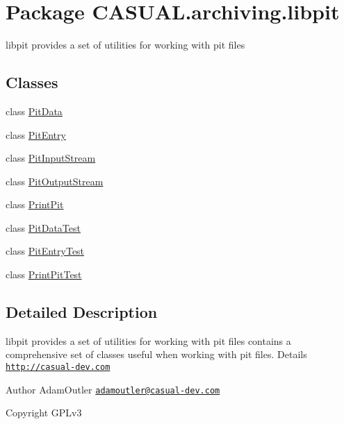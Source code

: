 \hypertarget{namespace_c_a_s_u_a_l_1_1archiving_1_1libpit}{\section{Package C\-A\-S\-U\-A\-L.\-archiving.\-libpit}
\label{namespace_c_a_s_u_a_l_1_1archiving_1_1libpit}
}


libpit provides a set of utilities for working with pit files  


\subsection*{Classes}
\begin{DoxyCompactItemize}
\item 
class \hyperlink{class_c_a_s_u_a_l_1_1archiving_1_1libpit_1_1_pit_data}{Pit\-Data}
\item 
class \hyperlink{class_c_a_s_u_a_l_1_1archiving_1_1libpit_1_1_pit_entry}{Pit\-Entry}
\item 
class \hyperlink{class_c_a_s_u_a_l_1_1archiving_1_1libpit_1_1_pit_input_stream}{Pit\-Input\-Stream}
\item 
class \hyperlink{class_c_a_s_u_a_l_1_1archiving_1_1libpit_1_1_pit_output_stream}{Pit\-Output\-Stream}
\item 
class \hyperlink{class_c_a_s_u_a_l_1_1archiving_1_1libpit_1_1_print_pit}{Print\-Pit}
\item 
class \hyperlink{class_c_a_s_u_a_l_1_1archiving_1_1libpit_1_1_pit_data_test}{Pit\-Data\-Test}
\item 
class \hyperlink{class_c_a_s_u_a_l_1_1archiving_1_1libpit_1_1_pit_entry_test}{Pit\-Entry\-Test}
\item 
class \hyperlink{class_c_a_s_u_a_l_1_1archiving_1_1libpit_1_1_print_pit_test}{Print\-Pit\-Test}
\end{DoxyCompactItemize}


\subsection{Detailed Description}
libpit provides a set of utilities for working with pit files contains a comprehensive set of classes useful when working with pit files. Details \href{http://casual-dev.com}{\tt http\-://casual-\/dev.\-com} \begin{DoxyAuthor}{Author}
Adam\-Outler \href{mailto:adamoutler@casual-dev.com}{\tt adamoutler@casual-\/dev.\-com} 
\end{DoxyAuthor}
\begin{DoxyCopyright}{Copyright}
G\-P\-Lv3 
\end{DoxyCopyright}
